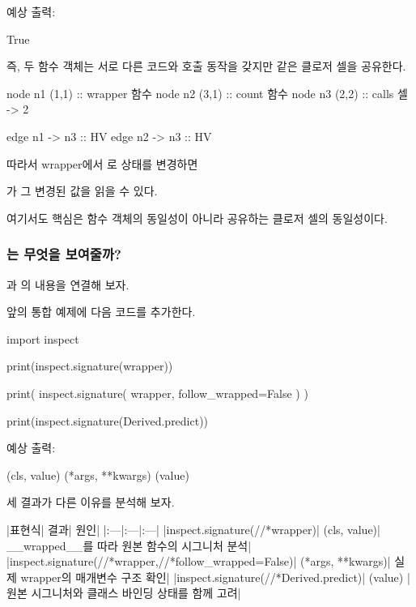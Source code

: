 예상 출력:

\begin{dhkzsh}
True
\end{dhkzsh}

즉, 두 함수 객체는 서로 다른 코드와 호출 동작을 갖지만 같은 클로저 셀을 공유한다.

\begin{dhkdiagram}[in=6]
node n1 (1,1) :: wrapper 함수
node n2 (3,1) :: count 함수
node n3 (2,2) :: calls 셀 -> 2

edge n1 -> n3 :: HV
edge n2 -> n3 :: HV
\end{dhkdiagram}

따라서 wrapper에서 로 상태를 변경하면

가 그 변경된 값을 읽을 수 있다.

여기서도 핵심은 함수 객체의 동일성이 아니라 공유하는 클로저 셀의 동일성이다.

\subsubsection{는 무엇을 보여줄까?}

과 의 내용을 연결해 보자.

앞의 통합 예제에 다음 코드를 추가한다.

\begin{dhkcode}
import inspect


print(inspect.signature(wrapper))

print(
    inspect.signature(
        wrapper,
        follow_wrapped=False
    )
)

print(inspect.signature(Derived.predict))
\end{dhkcode}

예상 출력:

\begin{dhkzsh}
(cls, value)
(*args, **kwargs)
(value)
\end{dhkzsh}

세 결과가 다른 이유를 분석해 보자.

\begin{dhktable}
|표현식|	결과|	원인|
|:---|:---|:---|
|inspect.signature(//*wrapper)|	(cls, value)|	__wrapped__를 따라 원본 함수의 시그니처 분석|
|inspect.signature(//*wrapper,//*follow_wrapped=False)|	(*args, **kwargs)|	실제 wrapper의 매개변수 구조 확인|
|inspect.signature(//*Derived.predict)|	(value)	|원본 시그니처와 클래스 바인딩 상태를 함께 고려|
\end{dhktable}

